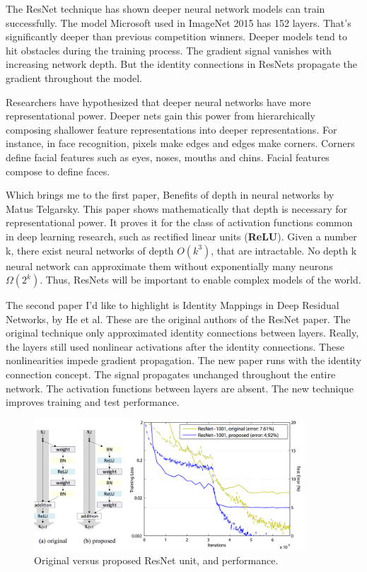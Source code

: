 \documentclass[12pt]{article}
\numberwithin{equation}{section}
\numberwithin{table}{section}
\numberwithin{figure}{section}
\begin{document}
The ResNet technique has shown deeper neural network models can train successfully. The model Microsoft used in ImageNet 2015 has 152 layers. That’s significantly deeper than previous competition winners. Deeper models tend to hit obstacles during the training process. The gradient signal vanishes with increasing network depth. But the identity connections in ResNets propagate the gradient throughout the model.

Researchers have hypothesized that deeper neural networks have more representational power. Deeper nets gain this power from hierarchically composing shallower feature representations into deeper representations. For instance, in face recognition, pixels make edges and edges make corners. Corners define facial features such as eyes, noses, mouths and chins. Facial features compose to define faces.

Which brings me to the first paper, Benefits of depth in neural networks by Matus Telgarsky. This paper shows mathematically that depth is necessary for representational power. It proves it for the class of activation functions common in deep learning research, such as rectified linear units (\textbf{ReLU}). Given a number k, there exist neural networks of depth $O(k^3)$, that are intractable. No depth k neural network can approximate them without exponentially many neurons $Ω(2^k)$. Thus, ResNets will be important to enable complex models of the world.

The second paper I’d like to highlight is Identity Mappings in Deep Residual Networks, by He et al. These are the original authors of the ResNet paper. The original technique only approximated identity connections between layers. Really, the layers still used nonlinear activations after the identity connections. These nonlinearities impede gradient propagation. The new paper runs with the identity connection concept. The signal propagates unchanged throughout the entire network. The activation functions between layers are absent. The new technique improves training and test performance.


\begin{figure} \centering
  \includegraphics[width=0.9\textwidth]{image1.png}
  \caption{Original versus proposed ResNet unit, and performance.}
  \label{figsolplot}
\end{figure}
\end{document}
